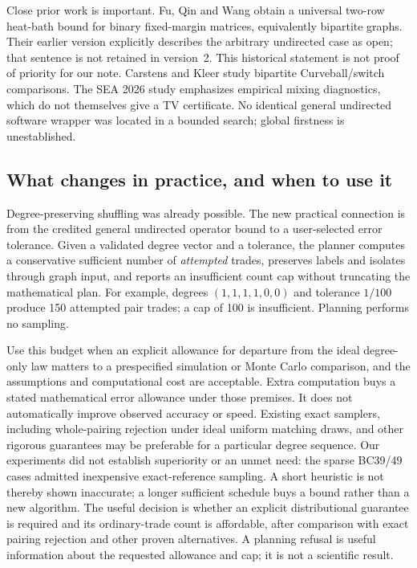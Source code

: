 \documentclass[11pt]{article}
\begin{document}
Close prior work is important. Fu, Qin and Wang \cite{FQW2} obtain a universal two-row heat-bath bound for binary fixed-margin matrices, equivalently bipartite graphs. Their earlier version \cite{FQW1} explicitly describes the arbitrary undirected case as open; that sentence is not retained in version~2. This historical statement is not proof of priority for our note. Carstens and Kleer \cite{CK} study bipartite Curveball/switch comparisons. The SEA 2026 study \cite{SEA} emphasizes empirical mixing diagnostics, which do not themselves give a TV certificate. No identical general undirected software wrapper was located in a bounded search; global firstness is unestablished.


\subsection{What changes in practice, and when to use it}
Degree-preserving shuffling was already possible. The new practical connection is from the credited general undirected operator bound to a user-selected error tolerance. Given a validated degree vector and a tolerance, the planner computes a conservative sufficient number of \emph{attempted} trades, preserves labels and isolates through graph input, and reports an insufficient count cap without truncating the mathematical plan. For example, degrees $(1,1,1,1,0,0)$ and tolerance $1/100$ produce 150 attempted pair trades; a cap of 100 is insufficient. Planning performs no sampling.

Use this budget when an explicit allowance for departure from the ideal degree-only law matters to a prespecified simulation or Monte Carlo comparison, and the assumptions and computational cost are acceptable. Extra computation buys a stated mathematical error allowance under those premises. It does not automatically improve observed accuracy or speed. Existing exact samplers, including whole-pairing rejection under ideal uniform matching draws, and other rigorous guarantees may be preferable for a particular degree sequence. Our experiments did not establish superiority or an unmet need: the sparse BC39/49 cases admitted inexpensive exact-reference sampling. A short heuristic is not thereby shown inaccurate; a longer sufficient schedule buys a bound rather than a new algorithm. The useful decision is whether an explicit distributional guarantee is required and its ordinary-trade count is affordable, after comparison with exact pairing rejection and other proven alternatives. A planning refusal is useful information about the requested allowance and cap; it is not a scientific result.
\end{document}
